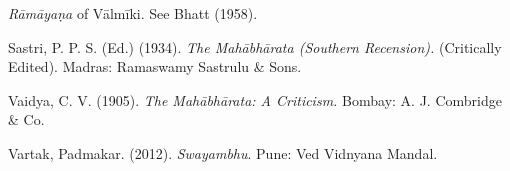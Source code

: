 \begin{thebibliography}{99}
  \textit{Rāmāyaṇa} of Vālmīki. See Bhatt (1958).

  Sastri, P. P. S. (Ed.) (1934). \textit{The Mahābhārata (Southern Recension).} (Critically Edited). Madras: Ramaswamy Sastrulu \& Sons.

  Vaidya, C. V. (1905). \textit{The Mahābhārata: A Criticism.} Bombay: A. J. Combridge \& Co.

  Vartak, Padmakar. (2012). \textit{Swayambhu}. Pune: Ved Vidnyana Mandal.

 \end{thebibliography}

